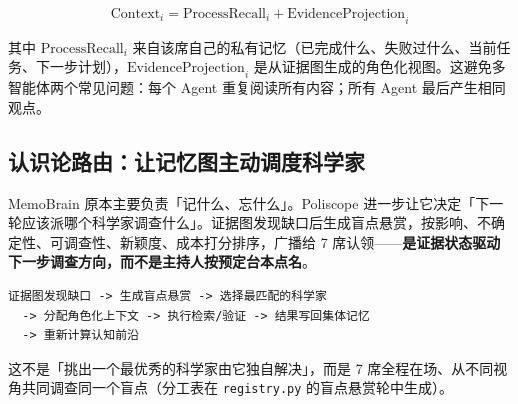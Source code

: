 \[
\text{Context}_i = \text{ProcessRecall}_i + \text{EvidenceProjection}_i
\]

其中 $\text{ProcessRecall}_i$ 来自该席自己的私有记忆（已完成什么、失败过什么、当前任务、下一步计划），$\text{EvidenceProjection}_i$ 是从证据图生成的角色化视图。这避免多智能体两个常见问题：每个 Agent 重复阅读所有内容；所有 Agent 最后产生相同观点。

\subsection{认识论路由：让记忆图主动调度科学家}

MemoBrain 原本主要负责「记什么、忘什么」。Poliscope 进一步让它决定「下一轮应该派哪个科学家调查什么」。证据图发现缺口后生成盲点悬赏，按影响、不确定性、可调查性、新颖度、成本打分排序，广播给 7 席认领——\textbf{是证据状态驱动下一步调查方向，而不是主持人按预定台本点名}。

\begin{lstlisting}
证据图发现缺口 -> 生成盲点悬赏 -> 选择最匹配的科学家
  -> 分配角色化上下文 -> 执行检索/验证 -> 结果写回集体记忆
  -> 重新计算认知前沿
\end{lstlisting}

这不是「挑出一个最优秀的科学家由它独自解决」，而是 7 席全程在场、从不同视角共同调查同一个盲点（分工表在 \texttt{registry.py} 的盲点悬赏轮中生成）。
